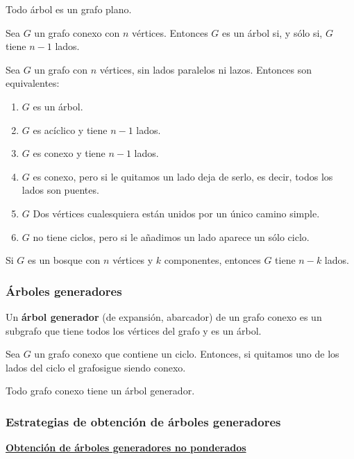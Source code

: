 \begin{nth}
    Todo árbol es un grafo plano.
\end{nth}
\begin{ncor}
    Sea $G$ un grafo conexo con $n$ vértices. Entonces $G$ es un árbol si, y sólo si, $G$ tiene $n-1$ lados.
\end{ncor}
\begin{nth}
    Sea $G$ un grafo con $n$ vértices, sin lados paralelos ni lazos. Entonces son equivalentes:
    \begin{enumerate}
        \item $G$ es un árbol.
        \item $G$ es acíclico y tiene $n-1$ lados.
        \item $G$ es conexo y tiene $n-1$ lados.
        \item $G$ es conexo, pero si le quitamos un lado deja de serlo, es decir, todos los lados son puentes.
        \item $G$ Dos vértices cualesquiera están unidos por un único camino simple.
        \item $G$ no tiene ciclos, pero si le añadimos un lado aparece un sólo ciclo.
    \end{enumerate}
\end{nth}
\begin{ncor}
    Si $G$ es un bosque con $n$ vértices y $k$ componentes, entonces $G$ tiene $n-k$ lados.
\end{ncor}

\subsubsection{Árboles generadores}
\begin{ndef}
    Un \textbf{árbol generador} (de expansión, abarcador) de un grafo conexo es un subgrafo que tiene todos los vértices del grafo y es un árbol.
\end{ndef}
\begin{lema}
    Sea $G$ un grafo conexo que contiene un ciclo. Entonces, si quitamos uno de los lados del ciclo el grafosigue siendo conexo.
\end{lema}
\begin{nprop}
    Todo grafo conexo tiene un árbol generador.
\end{nprop}

\subsubsection{Estrategias de obtención de árboles generadores}
\textbf{\underline{Obtención de árboles generadores no ponderados}} \\

